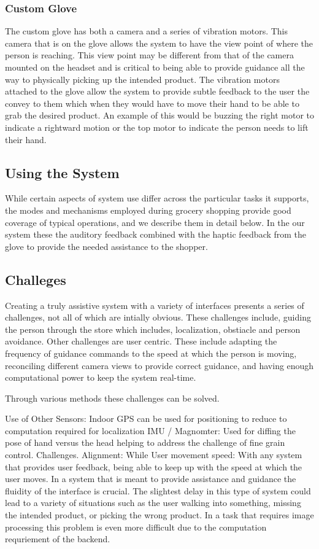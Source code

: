 \subsubsection{Custom Glove}
The custom glove has both a camera and a series of vibration motors.
This camera that is on the glove allows the system to have the view
 point of where the person is reaching. This view point may be different from
that of the camera mounted on the headset and is critical to being able to provide
guidance all the way to physically picking up the intended product.
The vibration motors attached to the glove allow the system to provide
subtle feedback to the user the convey to them which when they would
have to move their hand to be able to grab the desired product. An
example of this would be buzzing the right motor to indicate a
rightward motion or the top motor to indicate the person needs to lift
their hand.
\subsection{Using the System}
While certain aspects of system use differ across the particular tasks it supports, the modes and mechanisms employed during grocery shopping provide good coverage of typical operations, and we describe them in detail below.
In the our system these the auditory feedback combined with the haptic feedback from the glove
to provide the needed assistance to the shopper. 
\subsection{Challeges}
Creating a truly assistive system with a variety of interfaces presents a series 
of challenges, not all of which are intially obvious. These challenges include, guiding the person
through the store which includes, localization, obstiacle and person avoidance. Other challenges are
user centric. These include adapting the frequency of guidance commands to the speed at which the person is moving, 
reconciling different camera views to provide correct guidance, and having enough computational power to keep the system real-time.

Through various methods these challenges can be solved.




Use of Other Sensors:
Indoor GPS
can be used for positioning to reduce to computation required for localization
IMU / Magnomter:
Used for diffing the pose of hand versus the head helping to address the challenge of fine grain control.
Challenges.
Alignment:
While 
User movement speed:
With any system that provides user feedback, being able to keep up with the speed at which the user moves. In a system that is meant to provide assistance and guidance the fluidity of the interface is crucial. The slightest delay in this type of system could lead to a variety of situations such as the user walking into something, missing the intended product, or picking the wrong product. In a task that requires image processing this problem is even more difficult due to the computation requriement of the backend.



